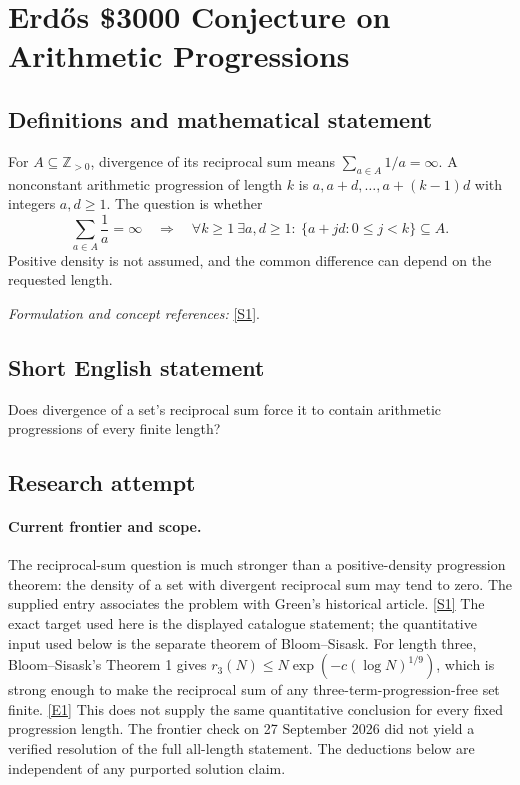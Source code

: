 \documentclass[11pt,a4paper]{article}
\newcommand{\Z}{\mathbb{Z}}
\newcommand{\sref}[2]{\hyperlink{source:#1:#2}{[S#2]}}
\newcommand{\eref}[2]{\hyperlink{extra:#1:#2}{[E#2]}}
\newif\ifshowcatalogue
\newcommand{\cataloguescope}[1]{\ifshowcatalogue
 \paragraph{Exact scope in the supplied catalogue.}
 \begin{quote}\small #1\end{quote}\fi}
\numberwithin{equation}{section}
\begin{document}
\setcounter{section}{0}
\clearpage
\section*{\texorpdfstring{Erdős \$3000 Conjecture on Arithmetic Progressions}{Erdős \$3000 Conjecture on Arithmetic Progressions}}\label{statement}
\subsection{Definitions and mathematical statement}
For $A\subseteq\Z_{>0}$, divergence of its reciprocal sum means $\sum_{a\in A}1/a=\infty$. A nonconstant arithmetic progression of length $k$ is $a,a+d,\ldots,a+(k-1)d$ with integers $a,d\ge1$. The question is whether
\[
 \sum_{a\in A}\frac1a=\infty\quad\Longrightarrow\quad
 \forall k\ge1\ \exists a,d\ge1:\ \{a+jd:0\le j<k\}\subseteq A.
\]
Positive density is not assumed, and the common difference can depend on the requested length.
\par\smallskip\textit{Formulation and concept references:} \sref{statement}{1}.
\cataloguescope{Determine whether every subset A of the natural numbers whose reciprocal sum diverges must contain arbitrarily long arithmetic progressions.}
\subsection{Short English statement}
Does divergence of a set's reciprocal sum force it to contain arithmetic progressions of every finite length?
\subsection{Research attempt}

\paragraph{Current frontier and scope.}
The reciprocal-sum question is much stronger than a positive-density
progression theorem: the density of a set with divergent reciprocal sum
may tend to zero.  The supplied entry associates the problem with
Green's historical article. \sref{statement}{1} The exact target used here is
the displayed catalogue statement; the quantitative input used below
is the separate theorem of Bloom--Sisask.
For length three, Bloom--Sisask's Theorem 1 gives
$r_3(N)\leq N\exp(-c(\log N)^{1/9})$, which is strong enough to make
the reciprocal sum of any three-term-progression-free set finite.
\eref{statement}{1}  This does not supply the same quantitative conclusion
for every fixed progression length.  The frontier check on
27 September 2026 did not yield a verified resolution of the full
all-length statement.  The deductions below are independent of any
purported solution claim.
\end{document}
